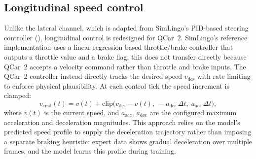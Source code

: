 \subsection{Longitudinal speed control}
\label{sec:longitudinal-control}
Unlike the lateral channel, which is adapted from SimLingo's PID-based steering controller (), longitudinal control is redesigned for QCar~2. SimLingo's reference implementation uses a linear-regression-based throttle/brake controller that outputs a throttle value and a brake flag; this does not transfer directly because QCar~2 accepts a velocity command rather than throttle and brake inputs. The QCar~2 controller instead directly tracks the desired speed $v_{\text{des}}$ with rate limiting to enforce physical plausibility. At each control tick the speed increment is clamped:
\begin{equation}
  v_{\text{cmd}}(t) = v(t) + \mathrm{clip}\!\bigl(v_{\text{des}} - v(t),\; -a_{\text{dec}}\,\Delta t,\; a_{\text{acc}}\,\Delta t\bigr),
\end{equation}
where $v(t)$ is the current speed, and $a_{\text{acc}}$, $a_{\text{dec}}$ are the configured maximum acceleration and deceleration magnitudes. This approach relies on the model's predicted speed profile to supply the deceleration trajectory rather than imposing a separate braking heuristic; expert data shows gradual deceleration over multiple frames, and the model learns this profile during training.

